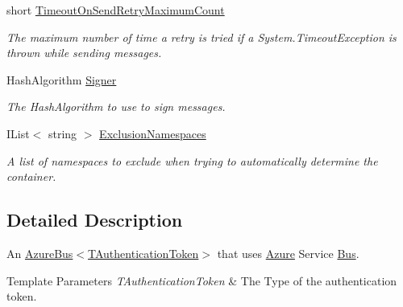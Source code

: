 \begin{DoxyCompactItemize}
short \hyperlink{classCqrs_1_1Azure_1_1ServiceBus_1_1AzureServiceBus_a4cc1f3523c56c534ff72c7da0e718482_a4cc1f3523c56c534ff72c7da0e718482}{Timeout\+On\+Send\+Retry\+Maximum\+Count}
\begin{DoxyCompactList}\small\item\em The maximum number of time a retry is tried if a System.\+Timeout\+Exception is thrown while sending messages. \end{DoxyCompactList}\item 
Hash\+Algorithm \hyperlink{classCqrs_1_1Azure_1_1ServiceBus_1_1AzureServiceBus_a3a49579c6f199f393c883b6f13fdbe39_a3a49579c6f199f393c883b6f13fdbe39}{Signer}
\begin{DoxyCompactList}\small\item\em The Hash\+Algorithm to use to sign messages. \end{DoxyCompactList}\item 
I\+List$<$ string $>$ \hyperlink{classCqrs_1_1Azure_1_1ServiceBus_1_1AzureServiceBus_a1b1fe260b6437442543b15048f47abc6_a1b1fe260b6437442543b15048f47abc6}{Exclusion\+Namespaces}
\begin{DoxyCompactList}\small\item\em A list of namespaces to exclude when trying to automatically determine the container. \end{DoxyCompactList}\end{DoxyCompactItemize}


\subsection{Detailed Description}
An \hyperlink{classCqrs_1_1Azure_1_1ServiceBus_1_1AzureBus_a1046ff74282fd178f43e28420433d2a9_a1046ff74282fd178f43e28420433d2a9}{Azure\+Bus$<$\+T\+Authentication\+Token$>$} that uses \hyperlink{namespaceCqrs_1_1Azure}{Azure} Service \hyperlink{namespaceCqrs_1_1Bus}{Bus}. 


\begin{DoxyTemplParams}{Template Parameters}
{\em T\+Authentication\+Token} & The Type of the authentication token.\\
\hline
\end{DoxyTemplParams}


